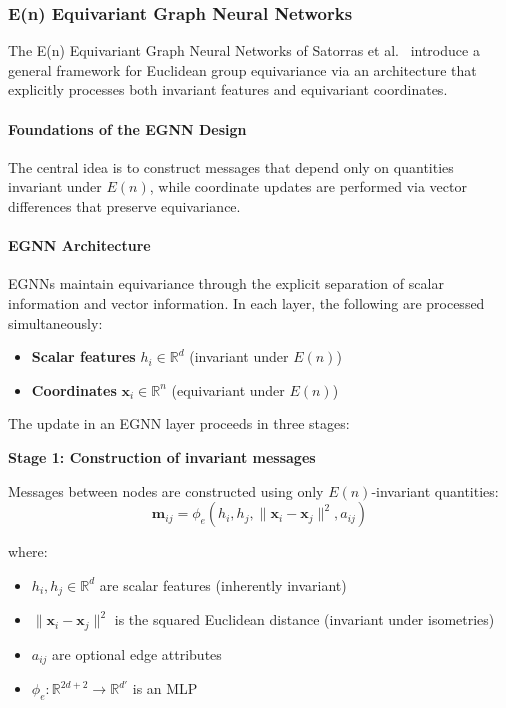 \subsubsection{E(n) Equivariant Graph Neural Networks}

The E(n) Equivariant Graph Neural Networks of Satorras et al.~\citep{satorras2021enequivariant} introduce a general framework for Euclidean group equivariance via an architecture that explicitly processes both invariant features and equivariant coordinates.

\paragraph{Foundations of the EGNN Design}

The central idea is to construct messages that depend only on quantities invariant under $E(n)$, while coordinate updates are performed via vector differences that preserve equivariance.

\paragraph{EGNN Architecture}

EGNNs maintain equivariance through the explicit separation of scalar information and vector information. In each layer, the following are processed simultaneously:
\begin{itemize}
    \item \textbf{Scalar features} $h_i \in \mathbb{R}^d$ (invariant under $E(n)$)
    \item \textbf{Coordinates} $\mathbf{x}_i \in \mathbb{R}^n$ (equivariant under $E(n)$)
\end{itemize}

The update in an EGNN layer proceeds in three stages:

\textbf{Stage 1: Construction of invariant messages}

Messages between nodes are constructed using only $E(n)$-invariant quantities:
\begin{equation}\label{eq:egnn_message}
\mathbf{m}_{ij} = \phi_e(h_i, h_j, \|\mathbf{x}_i - \mathbf{x}_j\|^2, a_{ij})
\end{equation}

where:
\begin{itemize}
    \item $h_i, h_j \in \mathbb{R}^d$ are scalar features (inherently invariant)
    \item $\|\mathbf{x}_i - \mathbf{x}_j\|^2$ is the squared Euclidean distance (invariant under isometries)
    \item $a_{ij}$ are optional edge attributes
    \item $\phi_e: \mathbb{R}^{2d+2} \to \mathbb{R}^{d'}$ is an MLP
\end{itemize}


